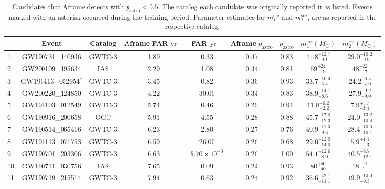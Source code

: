 \begin{table}[t]
\begin{threeparttable}
\tiny
\centering
\caption[Candidates that Aframe detects with $p_\mathrm{astro} < 0.5$ during O3]{Candidates that Aframe detects with $p_\mathrm{astro} < 0.5$. The catalog each candidate was originally reported in is listed. Events marked with an asterisk occurred during the training period. Parameter estimates for $m_1^\mathrm{src}$ and $m_2^\mathrm{src}$, are as reported in the respective catalog.}
\label{o3cat_tab:non_significant}
\setlength{\tabcolsep}{3pt}
\begin{tabular}{!{\vrule width 1pt}lcccccccc!{\vrule width 1pt}}
\toprule[1pt]
 & Event & Catalog & Aframe FAR $\mathrm{yr}^{-1}$ & FAR $\mathrm{yr}^{-1}$ & Aframe $p_\mathrm{astro}$ & $p_\mathrm{astro}$ & $m_1^\mathrm{src} (M_{\odot})$ & $m_2^\mathrm{src}(M_{\odot})$ \\
 & GW190731\_140936 & GWTC-3 & 1.89 & 0.33 & 0.47 & 0.83 & $41.8^{+12.7}_{-9.1}$ & $29.0^{+10.2}_{-9.9}$ \\
2 & GW200109\_195634 & IAS & 2.29 & 1.08 & 0.44 & 0.81 & $69_{-19}^{+24}$ & $48_{-17}^{+22}$ \\
3 & GW190413\_052954$^{*}$ & GWTC-3 & 3.45 & 0.82 & 0.36 & 0.93 & $33.7^{+10.4}_{-6.4}$ & $24.2^{+6.5}_{-7.0}$ \\
4 & GW200220\_124850 & GWTC-3 & 4.22 & 30.00 & 0.34 & 0.83 & $38.9^{+14.1}_{-8.6}$ & $27.9^{+9.2}_{-9.0}$ \\
5 & GW191103\_012549 & GWTC-3 & 5.74 & 0.46 & 0.29 & 0.94 & $11.8^{+6.2}_{-2.2}$ & $7.9^{+1.7}_{-2.4}$ \\
6 & GW190916\_200658 & OGC & 5.91 & 4.55 & 0.28 & 0.88 & $45.7^{+17.0}_{-12.3}$ & $24.0^{+13.2}_{-10.4}$ \\
7 & GW190514\_065416 & GWTC-3 & 6.23 & 2.80 & 0.27 & 0.76 & $40.9^{+17.3}_{-9.3}$ & $28.4^{+10.0}_{-10.1}$ \\
8 & GW191113\_071753 & GWTC-3 & 6.59 & 26.00 & 0.26 & 0.68 & $29.0^{+12.0}_{-14.0}$ & $5.9^{+4.4}_{-1.3}$ \\
9 & GW190701\_203306 & GWTC-3 & 6.63 & $5.70 \times 10^{-3}$ & 0.26 & 1.00 & $54.1^{+12.6}_{-8.0}$ & $40.5^{+8.7}_{-12.1}$ \\
10 & GW190711\_030756 & IAS & 7.65 & 0.09 & 0.24 & 0.93 & $80_{-40}^{+50}$ & $18_{-7}^{+11}$ \\
11 & GW190719\_215514 & GWTC-3 & 7.94 & 0.63 & 0.24 & 0.92 & $36.6^{+42.1}_{-11.1}$ & $19.9^{+10.0}_{-9.3}$ \\

\end{tabular}
\end{threeparttable}
\end{table}
